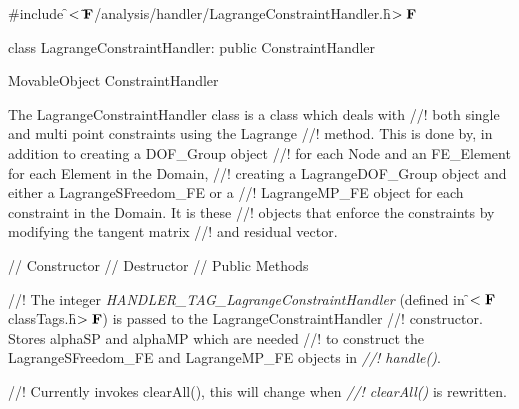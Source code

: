 
\indent \#include \f$<\tilde{
}{\bf F}$/analysis/handler/LagrangeConstraintHandler.h\f$>{\bf F}$ 

\indent class LagrangeConstraintHandler: public ConstraintHandler

\indent MovableObject
\indent\indent ConstraintHandler
\indent\indent{}

\indent The LagrangeConstraintHandler class is a class which deals with
//! both single and multi point constraints using the Lagrange
//! method. This is done by, in addition to creating a DOF\_Group object
//! for each Node and an FE\_Element for each Element in the Domain,
//! creating a LagrangeDOF\_Group object and either a LagrangeSFreedom\_FE or a
//! LagrangeMP\_FE object for each constraint in the Domain. It is these
//! objects that enforce the constraints by modifying the tangent matrix
//! and residual vector. 


\indent // Constructor
\indent // Destructor
\indent // Public Methods


//! The integer {\em HANDLER\_TAG\_LagrangeConstraintHandler} (defined in
\f$<{\bf F}$classTags.h\f$>{\bf F}$) is passed to the LagrangeConstraintHandler
//! constructor. Stores \p alphaSP and \p alphaMP which are needed
//! to construct the LagrangeSFreedom\_FE and LagrangeMP\_FE objects in {\em
//! handle()}.

//! Currently invokes clearAll(), this will change when {\em
//! clearAll()} is rewritten.


